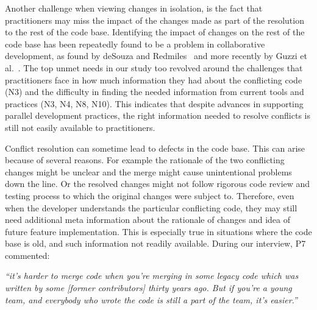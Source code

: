 Another challenge when viewing changes in isolation, is the fact that practitioners may miss the impact of the changes made as part of the resolution to the rest of the code base. Identifying the impact of changes on the rest of the code base has been repeatedly found to be a problem in collaborative development, as found by deSouza and Redmiles~\cite{deSouza2008} and more recently by Guzzi et al.~\cite{Guzzi2015}. The top unmet needs in our study too revolved around the challenges that practitioners face in how much information they had about the conflicting code (N3) and the difficulty in finding the needed information from current tools and practices (N3, N4, N8, N10). This indicates that despite advances in supporting parallel development practices, the right information needed to resolve conflicts is still not easily available to practitioners. 

Conflict resolution can sometime lead to defects in the code base. This can arise because of several reasons. For example the rationale of the two conflicting changes might be unclear and the merge might cause unintentional problems down the line. Or the resolved changes might not follow rigorous code review and testing process to which the original changes were subject to.
Therefore, even when the developer understands the particular conflicting code, they may still need additional meta information about the rationale of changes and idea of future feature implementation. This is especially true in situations where the code base is old, and such information not readily available. During our interview, P7 commented:
\begin{displayquote}
\textit{``it's harder to merge code when you're merging in some legacy code which was written by some [former contributors] thirty years ago. But if you're a young team, and everybody who wrote the code is still a part of the team, it's easier.''}
\end{displayquote}

